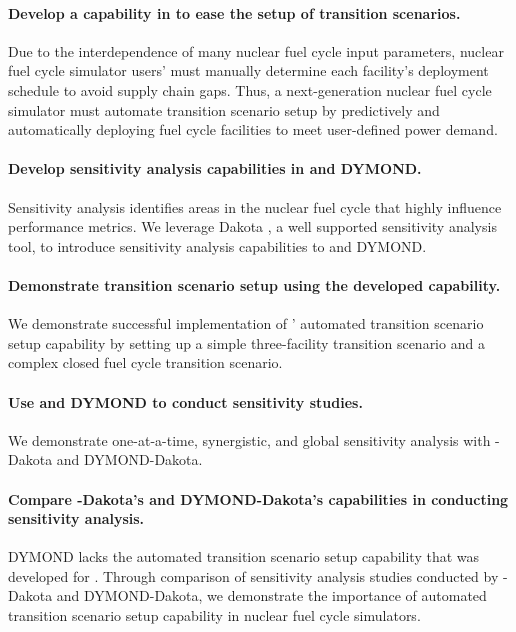 \paragraph{Develop a capability in \Cyclus to ease the setup of 
transition scenarios.}
Due to the interdependence of many nuclear fuel cycle input parameters, 
nuclear fuel cycle simulator users'
must manually determine each facility's deployment schedule 
to avoid supply chain gaps. 
Thus, a next-generation nuclear fuel cycle simulator must automate 
transition scenario setup by predictively and 
automatically deploying fuel cycle facilities to meet user-defined 
power demand. 

\paragraph{Develop sensitivity analysis capabilities in \Cyclus and DYMOND.}
Sensitivity analysis identifies areas in the nuclear fuel cycle
that highly influence performance metrics. 
We leverage Dakota \cite{eldred_dakota_2010}, a well supported sensitivity 
analysis tool, to introduce sensitivity analysis capabilities to 
\Cyclus and DYMOND.  

\paragraph{Demonstrate \Cyclus transition scenario setup using the 
developed capability.} 
We demonstrate successful implementation of \Cyclus' automated transition scenario 
setup capability by setting up a simple three-facility transition scenario and 
a complex closed fuel cycle transition scenario. 

\paragraph{Use \Cyclus and DYMOND to conduct sensitivity studies.}
We demonstrate one-at-a-time, synergistic, and global sensitivity analysis 
with \Cyclus-Dakota and DYMOND-Dakota. 

\paragraph{Compare \Cyclus-Dakota's and DYMOND-Dakota's capabilities in conducting sensitivity 
analysis.} 
DYMOND lacks the automated transition scenario setup capability that was developed for 
\Cyclus. 
Through comparison of sensitivity analysis studies conducted by \Cyclus-Dakota and 
DYMOND-Dakota, we demonstrate the importance of automated transition scenario setup 
capability in nuclear fuel cycle simulators. 


